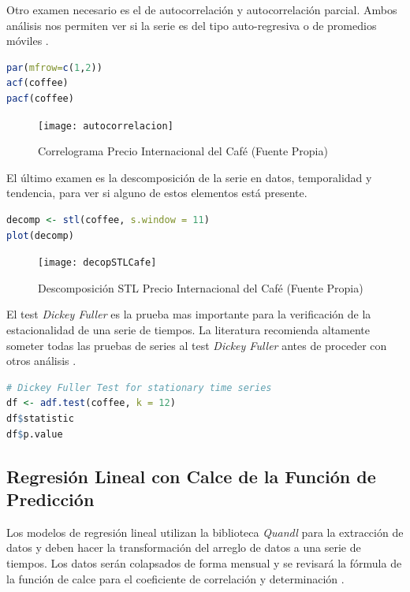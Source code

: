 Otro examen necesario es el de autocorrelación y autocorrelación parcial. Ambos análisis nos permiten ver si la serie es del tipo auto-regresiva o de promedios móviles \cite{hyndman}.

\begin{lstlisting}[language=R]
par(mfrow=c(1,2))
acf(coffee)
pacf(coffee)
\end{lstlisting}

\begin{figure}[H]
	\centering
	\texttt{[image: autocorrelacion]}\\
	\caption{Correlograma Precio Internacional del Café (Fuente Propia)}
\end{figure}

El último examen es la descomposición de la serie en datos, temporalidad y tendencia, para ver si alguno de estos elementos está presente.

\begin{lstlisting}[language=R]
decomp <- stl(coffee, s.window = 11)
plot(decomp)
\end{lstlisting}

\begin{figure}[H]
	\centering
	\texttt{[image: decopSTLCafe]}\\
	\caption{Descomposición STL Precio Internacional del Café (Fuente Propia)}
\end{figure}

El test \emph{Dickey Fuller} \cite{dickeyfuller} es la prueba mas importante para la verificación de la estacionalidad de una serie de tiempos. La literatura recomienda altamente someter todas las pruebas de series al test \emph{Dickey Fuller} antes de proceder con otros análisis \cite{hyndman}.

\begin{lstlisting}[language=R]
# Dickey Fuller Test for stationary time series
df <- adf.test(coffee, k = 12)
df$statistic
df$p.value
\end{lstlisting}

\subsection{Regresión Lineal con Calce de la Función de Predicción}
Los modelos de regresión lineal utilizan la biblioteca \emph{Quandl} para la extracción de datos y deben hacer la transformación del arreglo de datos a una serie de tiempos. Los datos serán colapsados de forma mensual y se revisará la fórmula de la función de calce para el coeficiente de correlación y determinación \cite{narayanachar}. 

